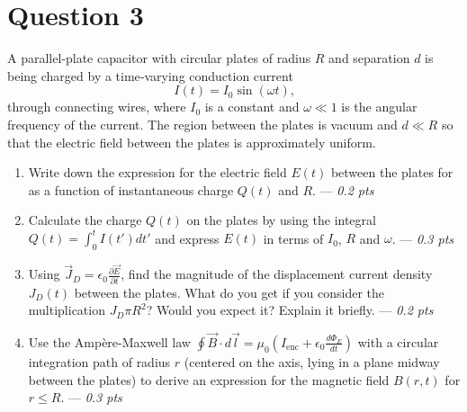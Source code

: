 \section*{Question 3}
\begin{minipage}{0.5\textwidth}
A parallel‑plate capacitor with circular plates of radius $R$ and separation $d$ is being charged by a time‑varying conduction current
\[
I(t) = I_0 \sin(\omega t) \text{,}
\]
through connecting wires, where $I_0$ is a constant and $\omega \ll 1$ is the angular frequency of the current. The region between the plates is vacuum and $d \ll R$ so that the electric field between the plates is approximately uniform.
\end{minipage}
\begin{minipage}{0.5\textwidth}
    \centering
\end{minipage}
\begin{enumerate}
    \item[(a)] Write down the expression for the electric field $E(t)$ between the plates for as a function of instantaneous charge $Q(t)$ and $R$. --- \textit{0.2 pts}
    \item[(b)] Calculate the charge $Q(t)$ on the plates by using the integral $Q(t) = \int_0^t I(t') dt'$ and express $E(t)$ in terms of $I_0$, $R$ and $\omega$. --- \textit{0.3 pts} 
    \item[(c)] Using $\vec{J}_D=\epsilon_0 \frac{\partial \vec{E}}{\partial t}$, find the magnitude of the displacement current density $J_D(t)$ between the plates. What do you get if you consider the multiplication $J_D \pi R^2$? Would you expect it? Explain it briefly. --- \textit{0.2 pts}
    \item[(d)] Use the Ampère-Maxwell law $\oint \vec{B} \cdot d\vec{l} = \mu_0 \left( I_\text{enc} + \epsilon_0 \frac{d\Phi_E}{dt} \right)$ with a circular integration path of radius $r$ (centered on the axis, lying in a plane midway between the plates) to derive an expression for the magnetic field $B(r,t)$ for $r \leq R$. --- \textit{0.3 pts}
\end{enumerate}

